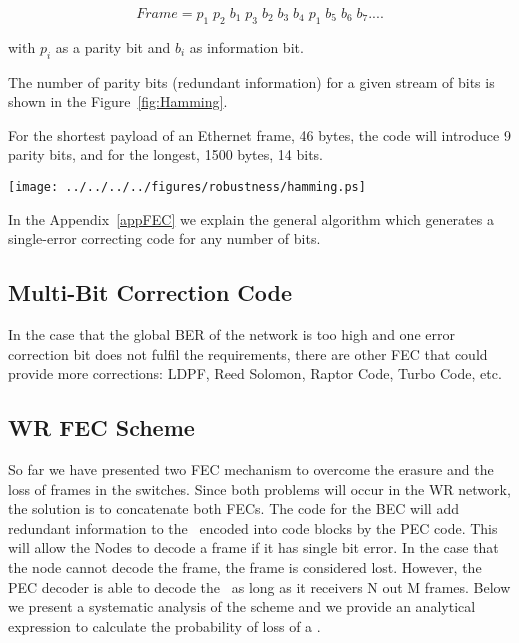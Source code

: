 \begin{equation}
	Frame =    p_1\;  p_2 \;  b_1 \;  p_3 \;  b_2 \;  b_3 \;  b_4 \;  p_1  \;  b_5 \; b_6  \; b_7 .... 
\end{equation}

with $p_i$ as a parity bit and $b_i$ as information bit. 


The number of parity bits (redundant information) for a given stream of bits is
shown in the Figure~\ref{fig:Hamming}.

For the shortest payload of an Ethernet frame, 46 bytes, the code will introduce
9 parity bits, and for the longest, 1500 bytes, 14 bits.

\begin{center}
        \texttt{[image: ../../../../figures/robustness/hamming.ps]}
        \label{fig:Hamming}
\end{center}

In the Appendix~\ref{appFEC} we explain the general algorithm which generates a
single-error correcting code for any number of bits. 

\subsection{Multi-Bit Correction Code}

In the case that the global BER of the network is too high and one error
correction bit does not fulfil the requirements, there are other FEC that
could provide more corrections: LDPF, Reed Solomon, Raptor Code, Turbo
Code, etc.

\subsection{WR FEC Scheme}

So far we have presented two FEC mechanism to overcome the erasure and the loss of frames in the switches. Since both problems will occur in the WR network, the solution is to concatenate both FECs. The code for the BEC will add
redundant information to the \ControlMessage\ encoded into code blocks by the
PEC code. This will allow the Nodes to decode a frame if
it has single bit error. In the case that the node cannot decode the frame,
the frame is considered lost. However, the PEC decoder is able
to decode the \ControlMessage\ as long as it receivers N out M frames. Below we
present a systematic analysis of the scheme and we provide an analytical
expression to calculate the probability of loss of a \ControlMessage.


